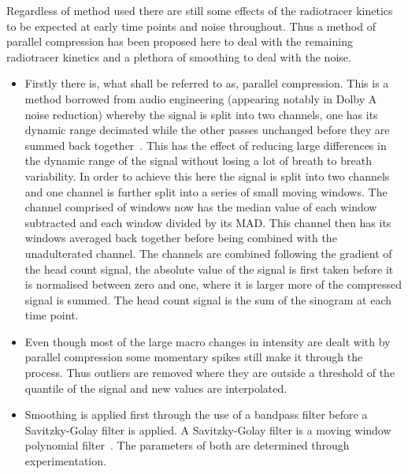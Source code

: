                     Regardless of method used there are still some effects of the radiotracer kinetics to be expected at early time points and noise throughout. Thus a method of parallel compression has been proposed here to deal with the remaining radiotracer kinetics and a plethora of smoothing to deal with the noise.
                    
                    \begin{itemize}
                        \item Firstly there is, what shall be referred to as, parallel compression. This is a method borrowed from audio engineering (appearing notably in Dolby A noise reduction) whereby the signal is split into two channels, one has its dynamic range decimated while the other passes unchanged before they are summed back together~. This has the effect of reducing large differences in the dynamic range of the signal without losing a lot of breath to breath variability. In order to achieve this here the signal is split into two channels and one channel is further split into a series of small moving windows. The channel comprised of windows now has the median value of each window subtracted and each window divided by its \gls{MAD}. This channel then has its windows averaged back together before being combined with the unadulterated channel. The channels are combined following the gradient of the head count signal, the absolute value of the signal is first taken before it is normalised between zero and one, where it is larger more of the compressed signal is summed. The head count signal is the sum of the sinogram at each time point.
                        
                        \item Even though most of the large macro changes in intensity are dealt with by parallel compression some momentary spikes still make it through the process. Thus outliers are removed where they are outside a threshold of the quantile of the signal and new values are interpolated.
                        
                        \item Smoothing is applied first through the use of a bandpass filter before a Savitzky-Golay filter is applied. A Savitzky-Golay filter is a moving window polynomial filter~. The parameters of both are determined through experimentation.
                    \end{itemize}
            
